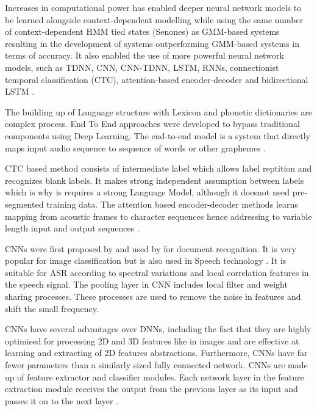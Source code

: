 Increases in computational power has enabled deeper neural network models to be learned alongside context-dependent modelling while using the same number of context-dependent HMM tied states (Senones) as GMM-based systems resulting in the development of systems outperforming GMM-based systems in terms of accuracy. It also enabled the use of more powerful neural network models, such as TDNN, CNN, CNN-TDNN, LSTM, RNNs, connectionist temporal classification (CTC), attention‐based encoder‐decoder and bidirectional LSTM \cite{bell_adaptation_2021}.

The building up of Language structure with Lexicon and phonetic dictionaries are complex process. End To End approaches were developed to bypass traditional components using Deep Learning. The end-to-end model \cite{eeckt_continual_2021} is a system that directly maps input audio sequence to sequence of words or other graphemes \cite{amodei_deep_2015-1, bell_adaptation_2020}. 

CTC based method consists of intermediate label which allows label reptition and recognizes blank labels. It makes strong independent assumption between labels which is why is requires a strong Language Model, although it doesnot need pre-segmented training data. The attention based encoder-decoder methods learns mapping from acoustic frames to character sequences hence addressing to variable length input and output sequences \cite{alsayadi_arabic_2021}. 

CNNs were first proposed by \cite{fukushima_neocognitron_1988} and used by \cite{lecun_gradient-based_1998} for document recognition. It is very popular for image classification but is also used in Speech technology \cite{abdel-hamid_exploring_2013} \cite{ghahremani_acoustic_2016} \cite{dua_developing_2022}. It is suitable for ASR according to spectral variations and local correlation features in the speech signal. The pooling layer in CNN includes local filter and weight sharing processes. These processes are used to remove the noise in features and shift the small frequency.

CNNs have several advantages over DNNs, including the fact that they are highly optimised for processing 2D and 3D features like in images and are effective at learning and extracting of 2D features abstractions. Furthermore, CNNs have far fewer parameters than a similarly sized fully connected network. CNNs are made up of feature extractor and classifier modules. Each network layer in the feature extraction module receives the output from the previous layer as its input and passes it on to the next layer \cite{backstrom_introduction_2022}. %

